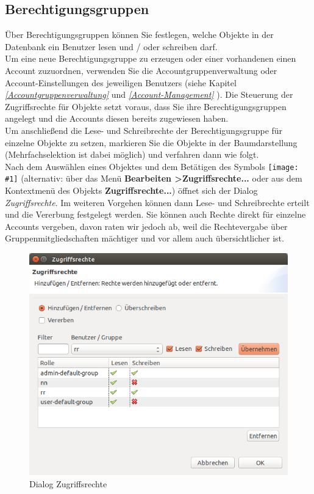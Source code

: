 \documentclass[a4paper,10pt]{book}
\newcommand{\icon}[1]{\texttt{[image: \#1]}}
\begin{document}
\subsection{Berechtigungsgruppen} \label{Berechtigungsgruppen}
Über Berechtigungsgruppen können Sie festlegen, welche Objekte in der Datenbank ein Benutzer lesen und / oder schreiben darf.
\newline\\
Um eine neue Berechtigungsgruppe zu erzeugen oder einer vorhandenen einen Account zuzuordnen, verwenden Sie die Accountgruppenverwaltung oder Account-Einstellungen des jeweiligen Benutzers (siehe Kapitel {\em \ref{Accountgruppenverwaltung} } und {\em \ref{Account-Management} }). Die Steuerung der Zugriffsrechte für Objekte setzt voraus, dass Sie
ihre Berechtigungsgruppen angelegt und die Accounts diesen bereits zugewiesen haben.
\newline\\
Um anschließend die Lese- und Schreibrechte der Berechtigungsgruppe für einzelne Objekte zu setzen, markieren Sie die Objekte in der
Baumdarstellung (Mehrfachselektion ist dabei möglich) und verfahren dann wie folgt.
\newline\\
Nach dem Auswählen eines Objektes und dem Betätigen des Symbols \icon{Icon/Zugriffsrechte.png} (alternativ:
über das Menü \textbf{Bearbeiten \textgreater Zugriffsrechte...} oder aus dem Kontextmenü des Objekts \textbf{Zugriffsrechte...})
öffnet sich der Dialog \textit{Zugriffsrechte}. Im weiteren Vorgehen können dann Lese- und Schreibrechte erteilt und die Vererbung festgelegt werden. Sie können auch Rechte direkt für einzelne Accounts vergeben, davon raten wir jedoch ab, weil die Rechtevergabe über
Gruppenmitgliedschaften mächtiger und vor allem auch übersichtlicher ist.
\newline
\begin{figure}[htb!]
  \centering
  \includegraphics[scale=.54]{Screenshot/zugriffsrechte-dialog.png}
  \caption{\label{Dialog Zugriffsrechte} Dialog Zugriffsrechte}
\end{figure}
\end{document}
